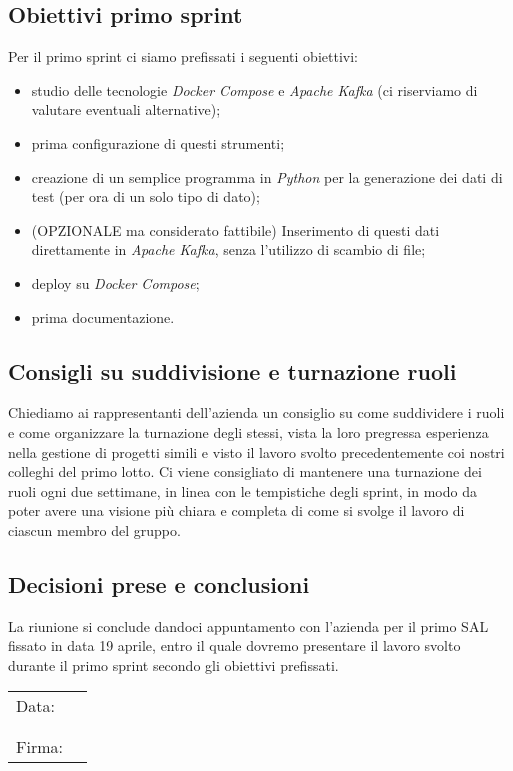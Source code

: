 \documentclass[italian,12pt]{article}
\begin{document}
\subsection{Obiettivi primo sprint}
Per il primo sprint ci siamo prefissati i seguenti obiettivi:
\begin{itemize}
	\item studio delle tecnologie \textit{Docker Compose} e \textit{Apache Kafka} (ci riserviamo di valutare eventuali alternative);
	\item prima configurazione di questi strumenti;
	\item creazione di un semplice programma in \textit{Python} per la generazione dei dati di test (per ora di un solo tipo di dato);
	\item (OPZIONALE ma considerato fattibile) Inserimento di questi dati direttamente in \textit{Apache Kafka}, senza l'utilizzo di scambio di file;
	\item deploy su \textit{Docker Compose};
	\item prima documentazione.
\end{itemize}

\subsection{Consigli su suddivisione e turnazione ruoli}
Chiediamo ai rappresentanti dell'azienda un consiglio su come suddividere i ruoli e come 
organizzare la turnazione degli stessi, vista la loro pregressa esperienza nella gestione 
di progetti simili e visto il lavoro svolto precedentemente coi nostri colleghi del primo lotto. 
Ci viene consigliato di mantenere una turnazione dei ruoli ogni due settimane, in linea con 
le tempistiche degli sprint, in modo da poter avere una visione più chiara e completa di 
come si svolge il lavoro di ciascun membro del gruppo.

\subsection{Decisioni prese e conclusioni}
La riunione si conclude dandoci appuntamento con l'azienda per il primo SAL fissato 
in data 19 aprile, entro il quale dovremo presentare il lavoro svolto durante il primo sprint 
secondo gli obiettivi prefissati.

\begin{table}[b]
	\begin{tabular}{@{}p{.5in}p{4in}@{}}
		Data:  & \hrulefill \\
			   &     		\\
			   &     		\\
		Firma: & \hrulefill \\
	\end{tabular}
	\end{table}
\end{document}
